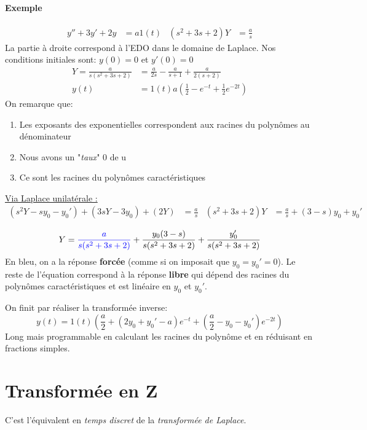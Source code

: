 \documentclass{report}
\begin{document}
\subsubsection{Exemple}
\begin{align*}
y'' + 3y' + 2y &= a1(t) & (s^2 + 3 s + 2)Y &= \frac{a}{s}
\end{align*}
La partie à droite correspond à l'EDO dans le domaine de Laplace. Nos conditions initiales sont: $y(0) = 0$ et $y'(0) = 0$
\begin{align*}
Y = \frac{a}{s(s^2 + 3s +2)} &= \frac{a}{2s} - \frac{a}{s+1} + \frac{a}{2(s+2)}\\
y(t) &= 1(t) a \left(\frac{1}{2} - e^{-t} + \frac{1}{2} e^{-2t} \right)
\end{align*}
On remarque que:
\begin{enumerate}
\item Les exposants des exponentielles correspondent aux racines du polynômes au dénominateur
\item Nous avons un "\textit{taux}" 0 de u
\item Ce sont les racines du polynômes caractéristiques
\end{enumerate}
\underline{Via Laplace unilatérale :}
\begin{align*}
(s^2 Y - sy_0 -y_0') + (3 sY -3 y_0) + (2Y) &= \frac{a}{s} & (s^2 + 3s + 2)Y &= \frac{a}{s} + (3-s) y_0 + y_0'\\
\end{align*}
\begin{equation}
Y = \textcolor{blue}{\frac{a}{s(s^2 + 3s + 2)}} + \frac{y_0 (3-s)}{s(s^2 + 3s + 2)} + \frac{y_0'}{s(s^2 + 3s +2)}
\end{equation}
En bleu, on a la réponse \textbf{forcée} (comme si on imposait que $y_0 = y_0' = 0$). Le reste de l'équation correspond à la réponse \textbf{libre} qui dépend des racines du polynômes caractéristiques et est linéaire en $y_0$ et $y_0'$.\par
On finit par réaliser la transformée inverse:
\begin{equation}
y(t) = 1(t) (\frac{a}{2} + (2 y_0 + y_0' -a ) e^{-t} + (\frac{a}{2} -y_0 -y_0') e^{-2t})
\end{equation}
Long mais programmable en calculant les racines du polynôme et en réduisant en fractions simples.


\chapter{Transformée en Z}
C'est l'équivalent en \textit{temps discret} de la \textit{transformée de Laplace}.
\end{document}
